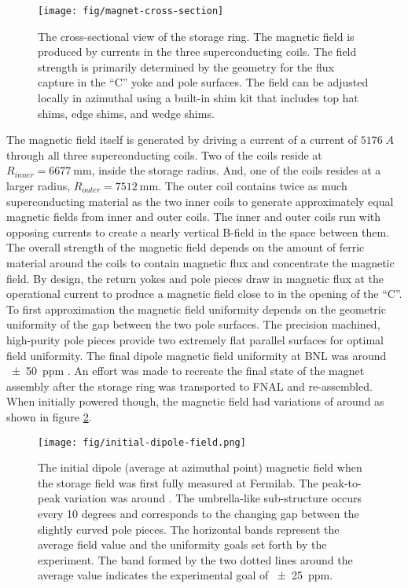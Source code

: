 \begin{figure}
\label{fig:magnet-cross-section}
\centering
\texttt{[image: fig/magnet-cross-section]}
\caption{The cross-sectional view of the storage ring.  The magnetic field is produced by currents in the three superconducting coils.  The field strength is primarily determined by the geometry for the flux capture in the ``C'' yoke and pole surfaces.  The field can be adjusted locally in azimuthal using a built-in shim kit that includes top hat shims, edge shims, and wedge shims.}
\end{figure}

The magnetic field itself is generated by driving a current of a current of $5176\;A$ through all three superconducting coils.  Two of the coils reside at $R_{inner} = \SI{6677}{\mm}$, inside the storage radius. And, one of the coils resides at a larger radius, $R_{outer} = \SI{7512}{\mm}$.  The outer coil contains twice as much superconducting material as the two inner coils to generate approximately equal magnetic fields from inner and outer coils.  The inner and outer coils run with opposing currents to create a nearly vertical B-field in the space between them.  The overall strength of the magnetic field depends on the amount of ferric material around the coils to contain magnetic flux and concentrate the magnetic field.  By design, the return yokes and pole pieces draw in magnetic flux at the operational current to produce a magnetic field close to \bmagic in the opening of the ``C''.  To first approximation the magnetic field uniformity depends on the geometric uniformity of the gap between the two pole surfaces.  The precision machined, high-purity pole pieces provide two extremely flat parallel surfaces for optimal field uniformity.  The final dipole magnetic field uniformity at BNL was around \SI{\pm50}{ppm} \cite{e821-prd}. An effort was made to recreate the final state of the magnet assembly after the storage ring was transported to FNAL and re-assembled.  When initially powered though, the magnetic field had variations of around  as shown in figure \ref{fig:initial-field}.

\begin{figure}
\label{fig:initial-field}
\centering
\texttt{[image: fig/initial-dipole-field.png]}
\caption{The initial dipole (average at azimuthal point) magnetic field when the storage field was first fully measured at Fermilab.  The peak-to-peak variation was around .  The umbrella-like sub-structure occurs every 10 degrees and corresponds to the changing gap between the slightly curved pole pieces.  The horizontal bands represent the average field value and the uniformity goals set forth by the experiment.  The band formed by the two dotted lines around the average value indicates the experimental goal of \SI{\pm 25}{ppm}.}
\end{figure}

